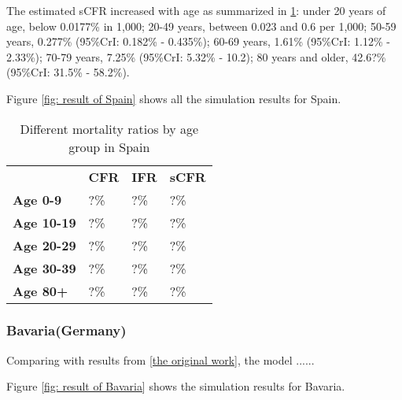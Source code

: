 \documentclass[../main.tex]{subfiles}
\begin{document}
The estimated sCFR increased with age as summarized in \ref{tab: sCFR_Spain_age}: under 20 years of age, below 0.0177\% in 1,000; 20-49 years, between 0.023 and 0.6 per 1,000; 50-59 years, 0.277\% (95\%CrI: 0.182\% - 0.435\%); 60-69 years, 1.61\% (95\%CrI: 1.12\% - 2.33\%); 70-79 years, 7.25\% (95\%CrI: 5.32\% - 10.2); 80 years and older, 42.6?\% (95\%CrI: 31.5\% - 58.2\%). 

Figure \ref{fig: result of Spain} shows all the simulation results for Spain. 

\begin{table}[!htbp] \centering
\begin{tabular}{p{3cm}p{2cm}p{2cm}p{2cm}}
& \textbf{CFR} & \textbf{IFR} & \textbf{sCFR} \\
\cmidrule(l){1-4}
 \textbf{Age 0-9} & ?\% & ?\% & ?\%\\
 \textbf{Age 10-19} & ?\% & ?\% & ?\%\\
 \textbf{Age 20-29} & ?\% & ?\% & ?\%\\
 \textbf{Age 30-39} & ?\% & ?\% & ?\%\\
 \textbf{Age 80+} & ?\% & ?\% & ?\%\\
\end{tabular}
\label{tab: sCFR_Spain_age}
\caption{Different mortality ratios by age group in Spain}
\end{table}






\subsubsection{Bavaria(Germany)}

Comparing with results from \ref{the original work}, the model ......

Figure \ref{fig: result of Bavaria} shows the simulation results for Bavaria. 


\end{document}
